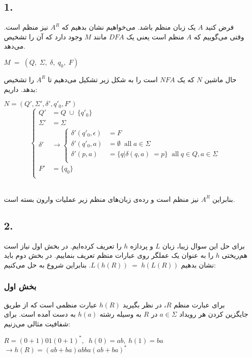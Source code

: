 \subsection*{1. }
فرض کنید $A$ یک زبان منظم باشد. می‌خواهیم نشان بدهیم که $A^R$ نیز منظم است.
وقتی می‌گوییم که $A$ منظم است یعنی یک 
$DFA$ مانند $M$ وجود دارد که آن را تشخیص می‌دهد.
\begin{center}
    $M \; = \;
    (Q,\; \Sigma,\; \delta,\; q_0,\;  F)$ \\[0.2in]
\end{center}
حال ماشین $N$ که یک $NFA$ است را به شکل زیر تشکیل می‌دهیم تا 
$A^R$ را تشخیص بدهد.
داریم:
\begin{center}
    $N = (Q', \Sigma', \delta', q'_0, F')$
    \begin{equation*}
    \begin{cases}
        Q' &= Q \; \cup \; \{q'_0\} \\
        \Sigma' &= \Sigma \\[0.15in]
        \delta' &\rightarrow
        \begin{cases}
            \delta'(q'_0,\epsilon)  &= F\\
            \delta'(q'_0,a) & = \emptyset \;\;  \text{all}\; a \in \Sigma \\
            \delta'(p,a) &= \{q|\delta(q,a)\;=p\}
            \;\; \text{all}\; q\in Q,a \in \Sigma\\
        \end{cases}\\[0.1in]
        F' &= \{q_0\}\\
    \end{cases}
    \end{equation*}
    \\[0.2in]
\end{center}

بنابراین $A^R$ نیز منظم است و 
رده‌ی زبان‌های منظم زير عمليات وارون بسته است.\\

\subsection*{2. }
برای حل این سوال زیبا، زبان $L$ و پردازه $h$ را تعریف کرده‌ایم.
در بخش اول نیاز است هم‌ریختی $h$ را به عنوان یک عملگر روی عبارات منظم تعریف بنماییم.
در بخش دوم باید نشان بدهیم $L(h(R)) \;=\; h(L(R))$. بنابراین شروع به حل می‌کنیم:
\subsubsection*{بخش اول}
برای عبارت منظم $R$، در نظر بگیرید $h(R)$ عبارت منظمی است که از طریق جایگزین کردن
هر رویداد $a \in \Sigma$ در $R$ به وسیله رشته $h(a)$ به دست آمده است. برای شفافیت مثالی می‌زنیم:
\begin{center}
    $R = (0+1)01(0+1)^*,\;\; h(0) = ab, \; h(1) = ba$\\[0.1in]
    $\rightarrow h(R) = (ab+ba)abba(ab+ba)^*$ \newline
\end{center}

